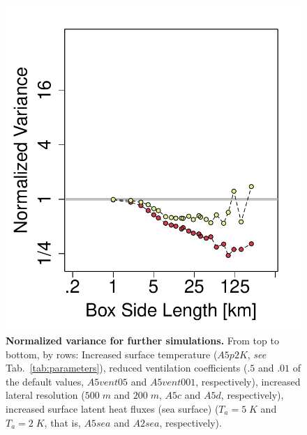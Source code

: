 \documentclass{article}
\begin{document}
\begin{figure}[ht]
\includegraphics[trim={0cm 0cm 0cm 0cm}, clip, height=0.27\linewidth]{var_2K_sea.pdf}
\caption{{\bf Normalized variance for further simulations.}
From top to bottom, by rows: 
Increased surface temperature ($A5p2K$, {\it see} Tab.~\ref{tab:parameters}), reduced ventilation coefficients ($.5$ and $.01$ of the default values, $A5vent05$ and $A5vent001$, respectively), increased lateral resolution ($500\;m$ and $200\;m$, $A5c$ and $A5d$, respectively), increased surface latent heat fluxes (sea surface) ($T_a=5\;K$ and $T_a=2\;K$, that is, $A5sea$ and $A2sea$, respectively).
}
\label{fig:variance_further_sims}
\end{figure}
\end{document}

